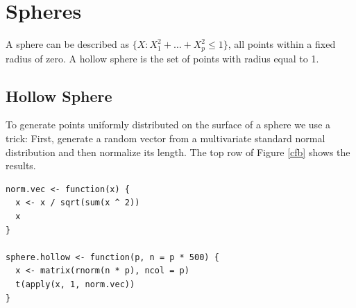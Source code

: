 \documentclass[article]{jss}
\begin{document}
\section{Spheres}

A sphere can be described as $\{X: X_1^2+\dots + X_p^2 \leq 1\}$, all
points within a fixed radius of zero.  A hollow sphere is the set of
points with radius equal to 1.

\subsection{Hollow Sphere}

To generate points uniformly distributed on the surface of a sphere we
use a trick: First, generate a random vector from a multivariate
standard normal distribution and then normalize its length. The top
row of Figure \ref{cfb} shows the results.

\begin{verbatim}
norm.vec <- function(x) {
  x <- x / sqrt(sum(x ^ 2))
  x
}

sphere.hollow <- function(p, n = p * 500) {
  x <- matrix(rnorm(n * p), ncol = p)
  t(apply(x, 1, norm.vec))
}
\end{verbatim}
\end{document}

